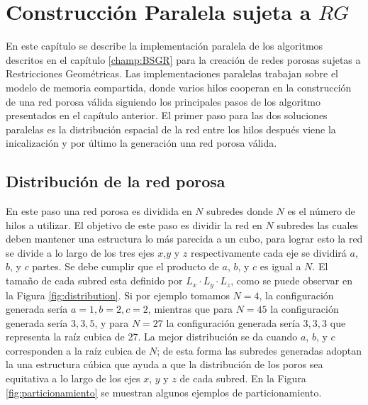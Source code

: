 \chapter{Construcción Paralela sujeta a $RG$}
\label{champ:PBSGR}
\bigskip
\barra
\bigskip
En este capítulo se describe la implementación paralela de los algoritmos descritos en el capítulo \ref{champ:BSGR} para la creación de redes porosas sujetas a Restricciones Geométricas. Las implementaciones paralelas trabajan sobre el modelo  de memoria compartida, donde varios hilos cooperan en la construcción de una red porosa válida siguiendo los principales pasos de los algoritmo presentados en el capítulo anterior. El primer paso para las dos soluciones paralelas es la distribución espacial de la red entre los hilos después viene la inicalizaci\'on y por \'ultimo la generación una red porosa v\'alida.

\section{Distribución de la red porosa}
\label{sec:pdistribution}
En este paso una red porosa es dividida en $N$ subredes donde $N$ es el número de hilos a utilizar. El objetivo de este paso es dividir la red en $N$ subredes las cuales deben mantener una estructura lo más parecida a un cubo, para lograr esto la red se divide a lo largo de los tres ejes $x$,$y$ y $z$ respectivamente cada eje se dividirá $a$, $b$, y $c$ partes. Se debe cumplir que el producto de  $a$, $b$, y $c$ es igual a $N$. El tamaño de cada subred esta definido por $L_x \cdot L_y \cdot L_z$, como se puede observar en la Figura \ref{fig:distribution}. Si por ejemplo tomamos $N=4$, la configuración generada ser\'ia $a=1,b=2,c=2$, mientras que para $N=45$ la configuración generada ser\'ia $3,3,5$, y para  $N = 27$ la configuración generada ser\'ia $3,3,3$ que representa la raíz cubica de 27. La mejor distribución se da cuando $a$, $b$, y $c$ corresponden a la raíz cubica de $N$; de esta forma las subredes generadas adoptan la una estructura cúbica que ayuda a que la distribución de los poros sea equitativa a lo largo de los ejes $x$, $y$ y $z$ de cada subred. En la Figura \ref{fig:particionamiento} se muestran algunos ejemplos de particionamiento.\\

